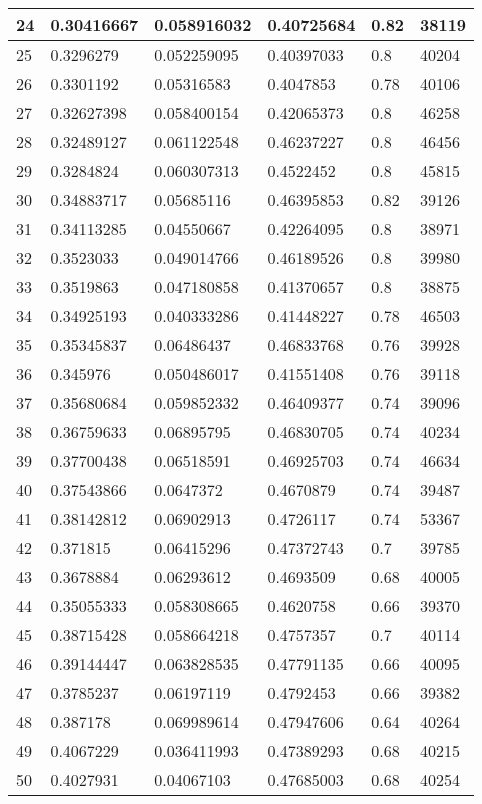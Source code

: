 \begin{longtable}{|l|l|l|l|l|l|}
24 & 0.30416667 & 0.058916032 & 0.40725684 & 0.82 & 38119 \\ \hline 
25 & 0.3296279 & 0.052259095 & 0.40397033 & 0.8 & 40204 \\ \hline 
26 & 0.3301192 & 0.05316583 & 0.4047853 & 0.78 & 40106 \\ \hline 
27 & 0.32627398 & 0.058400154 & 0.42065373 & 0.8 & 46258 \\ \hline 
28 & 0.32489127 & 0.061122548 & 0.46237227 & 0.8 & 46456 \\ \hline 
29 & 0.3284824 & 0.060307313 & 0.4522452 & 0.8 & 45815 \\ \hline 
30 & 0.34883717 & 0.05685116 & 0.46395853 & 0.82 & 39126 \\ \hline 
31 & 0.34113285 & 0.04550667 & 0.42264095 & 0.8 & 38971 \\ \hline 
32 & 0.3523033 & 0.049014766 & 0.46189526 & 0.8 & 39980 \\ \hline 
33 & 0.3519863 & 0.047180858 & 0.41370657 & 0.8 & 38875 \\ \hline 
34 & 0.34925193 & 0.040333286 & 0.41448227 & 0.78 & 46503 \\ \hline 
35 & 0.35345837 & 0.06486437 & 0.46833768 & 0.76 & 39928 \\ \hline 
36 & 0.345976 & 0.050486017 & 0.41551408 & 0.76 & 39118 \\ \hline 
37 & 0.35680684 & 0.059852332 & 0.46409377 & 0.74 & 39096 \\ \hline 
38 & 0.36759633 & 0.06895795 & 0.46830705 & 0.74 & 40234 \\ \hline 
39 & 0.37700438 & 0.06518591 & 0.46925703 & 0.74 & 46634 \\ \hline 
40 & 0.37543866 & 0.0647372 & 0.4670879 & 0.74 & 39487 \\ \hline 
41 & 0.38142812 & 0.06902913 & 0.4726117 & 0.74 & 53367 \\ \hline 
42 & 0.371815 & 0.06415296 & 0.47372743 & 0.7 & 39785 \\ \hline 
43 & 0.3678884 & 0.06293612 & 0.4693509 & 0.68 & 40005 \\ \hline 
44 & 0.35055333 & 0.058308665 & 0.4620758 & 0.66 & 39370 \\ \hline 
45 & 0.38715428 & 0.058664218 & 0.4757357 & 0.7 & 40114 \\ \hline 
46 & 0.39144447 & 0.063828535 & 0.47791135 & 0.66 & 40095 \\ \hline 
47 & 0.3785237 & 0.06197119 & 0.4792453 & 0.66 & 39382 \\ \hline 
48 & 0.387178 & 0.069989614 & 0.47947606 & 0.64 & 40264 \\ \hline 
49 & 0.4067229 & 0.036411993 & 0.47389293 & 0.68 & 40215 \\ \hline 
50 & 0.4027931 & 0.04067103 & 0.47685003 & 0.68 & 40254 \\ \hline 
\end{longtable}